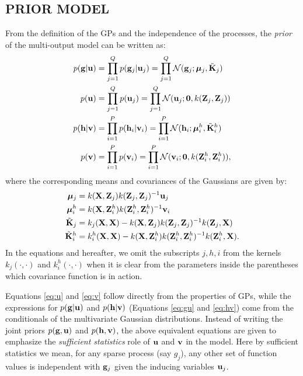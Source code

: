 \subsection{PRIOR MODEL}
From the definition of the GPs and the independence of the processes, 
the \emph{prior} of the multi-output model can be written as:
\begin{align}
\label{eq:gu}
p(\mathbf{g} | \mathbf{u}) &= \prod_{j=1}^Q p(\mathbf{g}_j | \mathbf{u}_j) = \prod_{j=1}^Q \mathcal{N}(\mathbf{g}_j; \boldsymbol{\mu}_j, \tilde{\mathbf{K}}_j )\\
\label{eq:u}
p(\mathbf{u}) &= \prod_{j=1}^Q p(\mathbf{u}_j) = \prod_{j=1}^Q \mathcal{N}(\mathbf{u}_j; \mathbf{0}, k(\mathbf{Z}_j, \mathbf{Z}_j)) \\
\label{eq:hv}
p(\mathbf{h} | \mathbf{v}) &= \prod_{i=1}^P p(\mathbf{h}_i | \mathbf{v}_i) = \prod_{i=1}^P \mathcal{N}(\mathbf{h}_i; \boldsymbol{\mu}^h_i, \tilde{\mathbf{K}}^h_i)\\
\label{eq:v}
p(\mathbf{v}) &= \prod_{i=1}^P p(\mathbf{v}_i) = \prod_{i=1}^P \mathcal{N}(\mathbf{v}_i; \mathbf{0}, k(\mathbf{Z}^h_i, \mathbf{Z}^h_i)),
\end{align}
where the corresponding means and covariances of the Gaussians are given by:
\begin{align}
 \boldsymbol{\mu}_j &= k(\mathbf{X},\mathbf{Z}_j)k(\mathbf{Z}_j,\mathbf{Z}_j)^{-1}\mathbf{u}_j \\
\boldsymbol{\mu}^h_i &= k(\mathbf{X},\mathbf{Z}^h_i)k(\mathbf{Z}^h_i,\mathbf{Z}^h_i)^{-1}\mathbf{v}_i \\
\tilde{\mathbf{K}}_j &= k_j(\mathbf{X},\mathbf{X}) - k(\mathbf{X},\mathbf{Z}_j)k(\mathbf{Z}_j,\mathbf{Z}_j)^{-1}k(\mathbf{Z}_j,\mathbf{X}) \\
\tilde{\mathbf{K}}^h_i &= k^h_i(\mathbf{X},\mathbf{X}) - k(\mathbf{X},\mathbf{Z}^h_i)k(\mathbf{Z}^h_i,\mathbf{Z}^h_i)^{-1}k(\mathbf{Z}^h_i,\mathbf{X}).
\end{align}
In the equations and hereafter, we omit the subscripts $j,h,i$ from the kernels $k_j(\cdot,\cdot)$ and $k^h_i(\cdot,\cdot)$ when it is clear from the parameters inside the parentheses which covariance function is in action.

Equations \eqref{eq:u} and \eqref{eq:v} follow directly from the properties of GPs, while the expressions for $p(\mathbf{g}|\mathbf{u})$ and $p(\mathbf{h}|\mathbf{v})$ (Equations  \eqref{eq:gu} and \eqref{eq:hv}) come from the conditionals of the multivariate Gaussian distributions.
Instead of writing the joint priors $p(\mathbf{g},\mathbf{u})$ and $p(\mathbf{h},\mathbf{v})$, the above equivalent equations are given to emphasize the \emph{sufficient statistics} role of $\mathbf{u}$ and $\mathbf{v}$ in the model.
Here by sufficient statistics we mean, for any sparse process (say $g_j$), any other set of function values is independent with $\mathbf{g}_j$ given the inducing variables $\mathbf{u}_j$.
%
